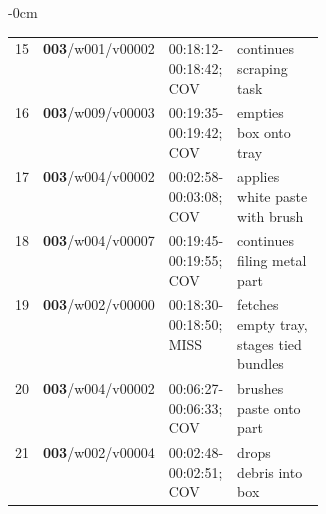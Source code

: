 \begin{table}[!t]
\begin{adjustwidth}{-\extralength}{0cm}
\begin{tabularx}{\linewidth}{@{}r p{0.16\linewidth} p{0.20\linewidth} L@{}}
15 & \textbf{003}/w001/v00002 & 00:18:12-00:18:42; COV & continues scraping task \\
16 & \textbf{003}/w009/v00003 & 00:19:35-00:19:42; COV & empties box onto tray \\
17 & \textbf{003}/w004/v00002 & 00:02:58-00:03:08; COV & applies white paste with brush \\
18 & \textbf{003}/w004/v00007 & 00:19:45-00:19:55; COV & continues filing metal part \\
19 & \textbf{003}/w002/v00000 & 00:18:30-00:18:50; MISS & fetches empty tray, stages tied bundles \\
20 & \textbf{003}/w004/v00002 & 00:06:27-00:06:33; COV & brushes paste onto part \\
21 & \textbf{003}/w002/v00004 & 00:02:48-00:02:51; COV & drops debris into box \\
\bottomrule\end{tabularx}\end{adjustwidth}\end{table}
